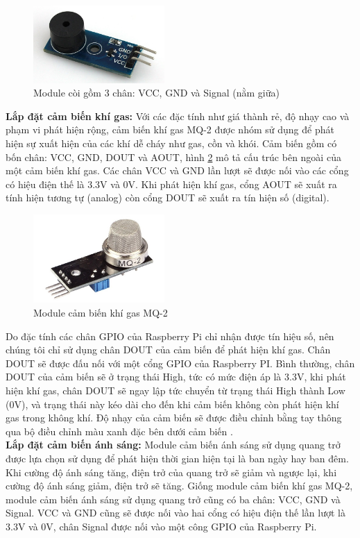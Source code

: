 \documentclass[12pt,a4paper,oneside]{extbook}
\begin{document}
\begin{figure}[h]
  \centering
     \includegraphics[width=5cm]{6-buzzer}
  \caption{Module còi gồm 3 chân: VCC, GND và Signal (nằm giữa)}\label{fig:6-buzzer}
\end{figure}

\noindent
\textbf{Lắp đặt cảm biến khí gas:} Với các đặc tính như giá thành rẻ, độ nhạy cao và phạm vi phát hiện rộng, cảm biến khí gas MQ-2 được nhóm sử dụng để phát hiện sự xuất hiện của các khí dễ cháy như gas, cồn và khói. Cảm biến gồm có bốn chân: VCC, GND, DOUT và AOUT, hình \ref{fig:6-gas-sensor} mô tả cấu trúc bên ngoài của một cảm biến khí gas. Các chân VCC và GND lần lượt sẽ được nối vào các cổng có hiệu điện thế là 3.3V và 0V. Khi phát hiện khí gas, cổng AOUT sẽ xuất ra tính hiện tương tự (analog) còn cổng DOUT sẽ xuất ra tín hiện số (digital).

\begin{figure}[h]
  \centering
     \includegraphics[width=5cm]{6-gas-sensor}
  \caption{Module cảm biến khí gas MQ-2}\label{fig:6-gas-sensor}
\end{figure}

\noindent
Do đặc tính các chân GPIO của Raspberry Pi chỉ nhận được tín hiệu số, nên chúng tôi chỉ sử dụng chân DOUT của cảm biến để phát hiện khí gas. Chân DOUT sẽ được đấu nối với một cổng GPIO của Raspberry PI. Bình thường, chân DOUT của cảm biến sẽ ở trạng thái High, tức có mức điện áp là 3.3V, khi phát hiện khí gas, chân DOUT sẽ ngay lập tức chuyển từ trạng thái High thành Low (0V), và trạng thái này kéo dài cho đến khi cảm biến không còn phát hiện khí gas trong không khí. Độ nhạy của cảm biến sẽ được điều chỉnh bằng tay thông qua bộ điều chỉnh màu xanh đặc bên dưới cảm biến \cite{gas-sensor}.\\

\noindent
\textbf{Lắp đặt cảm biến ánh sáng:} Module cảm biến ánh sáng sử dụng quang trở được lựa chọn sử dụng để phát hiện thời gian hiện tại là ban ngày hay ban đêm. Khi cường độ ánh sáng tăng, điện trở của quang trở sẽ giảm và ngược lại, khi cường độ ánh sáng giảm, điện trở sẽ tăng. Giống module cảm biến khí gas MQ-2, module cảm biến ánh sáng sử dụng quang trở cũng có ba chân: VCC, GND và Signal. VCC và GND cũng sẽ được nối vào hai cổng có hiệu điện thế lần lượt là 3.3V và 0V, chân Signal được nối vào một công GPIO của Raspberry Pi.\\
\end{document}
